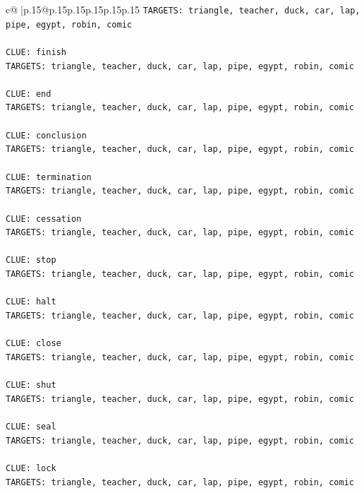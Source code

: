 \documentclass{article}
\begin{document}
{\begin{supertabular}{c@{$\;$}|p{.15\linewidth}@{}p{.15\linewidth}p{.15\linewidth}p{.15\linewidth}p{.15\linewidth}p{.15\linewidth}}
{{{\texttt{TARGETS: triangle, teacher, duck, car, lap, pipe, egypt, robin, comic} \\
\\ 
\texttt{CLUE: finish} \\
\texttt{TARGETS: triangle, teacher, duck, car, lap, pipe, egypt, robin, comic} \\
\\ 
\texttt{CLUE: end} \\
\texttt{TARGETS: triangle, teacher, duck, car, lap, pipe, egypt, robin, comic} \\
\\ 
\texttt{CLUE: conclusion} \\
\texttt{TARGETS: triangle, teacher, duck, car, lap, pipe, egypt, robin, comic} \\
\\ 
\texttt{CLUE: termination} \\
\texttt{TARGETS: triangle, teacher, duck, car, lap, pipe, egypt, robin, comic} \\
\\ 
\texttt{CLUE: cessation} \\
\texttt{TARGETS: triangle, teacher, duck, car, lap, pipe, egypt, robin, comic} \\
\\ 
\texttt{CLUE: stop} \\
\texttt{TARGETS: triangle, teacher, duck, car, lap, pipe, egypt, robin, comic} \\
\\ 
\texttt{CLUE: halt} \\
\texttt{TARGETS: triangle, teacher, duck, car, lap, pipe, egypt, robin, comic} \\
\\ 
\texttt{CLUE: close} \\
\texttt{TARGETS: triangle, teacher, duck, car, lap, pipe, egypt, robin, comic} \\
\\ 
\texttt{CLUE: shut} \\
\texttt{TARGETS: triangle, teacher, duck, car, lap, pipe, egypt, robin, comic} \\
\\ 
\texttt{CLUE: seal} \\
\texttt{TARGETS: triangle, teacher, duck, car, lap, pipe, egypt, robin, comic} \\
\\ 
\texttt{CLUE: lock} \\
\texttt{TARGETS: triangle, teacher, duck, car, lap, pipe, egypt, robin, comic} \\
}}}
\end{supertabular}}
\end{document}
